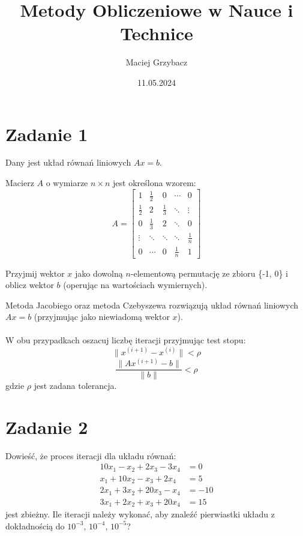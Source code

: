 \documentclass{article}
\begin{document}
\title{Metody Obliczeniowe w Nauce i Technice}
\author{Maciej Grzybacz}
\date{11.05.2024}
\maketitle

\section*{Zadanie 1}
Dany jest układ równań liniowych \(Ax=b\).

\noindent Macierz \(A\) o wymiarze \(n \times n\) jest określona wzorem:
\[
A = \begin{bmatrix}
1 & \frac{1}{2} & 0 & \cdots & 0 \\
\frac{1}{2} & 2 & \frac{1}{3} & \ddots & \vdots \\
0 & \frac{1}{3} & 2 & \ddots & 0 \\
\vdots & \ddots & \ddots & \ddots & \frac{1}{n} \\
0 & \cdots & 0 & \frac{1}{n} & 1
\end{bmatrix}
\]

\noindent Przyjmij wektor \(x\) jako dowolną \(n\)-elementową permutację ze zbioru \{-1, 0\} i oblicz wektor \(b\) (operując na wartościach wymiernych).

\noindent Metoda Jacobiego oraz metoda Czebyszewa rozwiązują układ równań liniowych \(Ax=b\) (przyjmując jako niewiadomą wektor \(x\)).
\\\\
\noindent W obu przypadkach oszacuj liczbę iteracji przyjmując test stopu:
\[
\|x^{(i+1)} - x^{(i)}\| < \rho
\]
\[
\frac{\|Ax^{(i+1)} - b\|}{\|b\|} < \rho
\]
gdzie \(\rho\) jest zadana tolerancja.

\section*{Zadanie 2}

Dowieść, że proces iteracji dla układu równań:
\begin{align*}
10x_1 - x_2 + 2x_3 - 3x_4 &= 0 \\
x_1 + 10x_2 - x_3 + 2x_4 &= 5 \\
2x_1 + 3x_2 + 20x_3 - x_4 &= -10 \\
3x_1 + 2x_2 + x_3 + 20x_4 &= 15
\end{align*}
jest zbieżny. Ile iteracji należy wykonać, aby znaleźć pierwiastki układu z dokładnością do \(10^{-3}\), \(10^{-4}\), \(10^{-5}\)?
\end{document}
